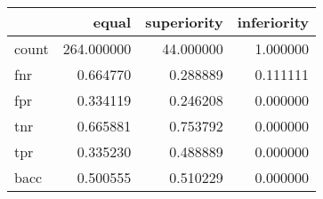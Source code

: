 \begin{tabular}{lrrr}
\toprule
{} &       equal &  superiority &  inferiority \\
\midrule
count &  264.000000 &    44.000000 &     1.000000 \\
fnr   &    0.664770 &     0.288889 &     0.111111 \\
fpr   &    0.334119 &     0.246208 &     0.000000 \\
tnr   &    0.665881 &     0.753792 &     0.000000 \\
tpr   &    0.335230 &     0.488889 &     0.000000 \\
bacc  &    0.500555 &     0.510229 &     0.000000 \\
\bottomrule
\end{tabular}
